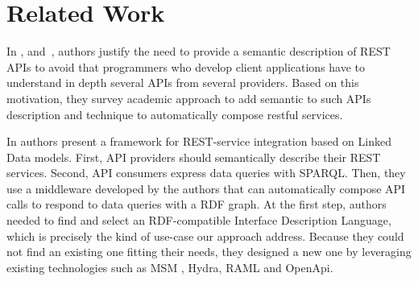 \section{Related Work}




In \cite{verborgh_rest_2014}, and~\cite{7195633}, authors justify the need to provide a semantic description of REST APIs to avoid that programmers who develop client applications have to understand in depth several APIs from several providers. Based on this motivation, they survey academic approach to add semantic to such APIs description and technique to automatically compose restful services. %



In \cite{serrano2017linked} authors present a framework for REST-service integration based on Linked Data models. First, API providers should semantically describe their REST services. Second, API consumers express data queries with SPARQL. Then, they use a middleware developed by the authors that can automatically compose API calls to respond to data queries with a RDF graph.
At the first step, authors needed to find and select an RDF-compatible Interface Description Language, which is precisely the kind of use-case our approach address. Because they could not find an existing one fitting their needs, they designed a new one by leveraging existing technologies such as MSM \cite{pedrinaci2010toward}, Hydra, RAML and OpenApi. %

